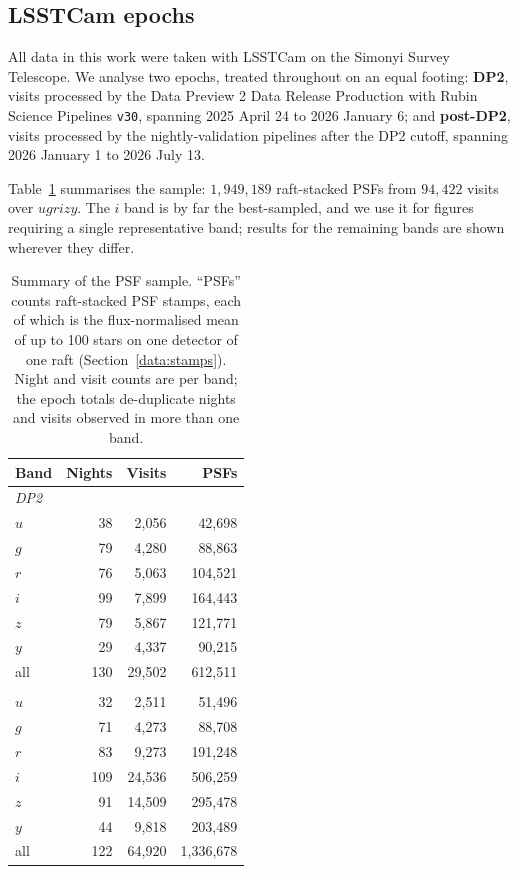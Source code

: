 \documentclass[]{spie}
\newcommand{\ugrizy}{\ensuremath{ugrizy}}
\begin{document}
\subsection{LSSTCam epochs}
\label{data:visits}

All data in this work were taken with LSSTCam on the Simonyi Survey Telescope. We analyse
two epochs, treated throughout on an equal footing: \textbf{DP2}, visits processed by the
Data Preview 2 Data Release Production \cite{DP2} with Rubin Science Pipelines
\texttt{v30}, spanning 2025 April 24 to 2026 January 6; and \textbf{post-DP2}, visits
processed by the nightly-validation pipelines after the DP2 cutoff, spanning 2026 January
1 to 2026 July 13.

Table~\ref{tab:sample} summarises the sample: $1{,}949{,}189$ raft-stacked PSFs from
$94{,}422$ visits over \ugrizy. The $i$ band is by far the best-sampled, and we use it for
figures requiring a single representative band; results for the remaining bands are shown
wherever they differ.

\begin{table}[htbp]
\caption{Summary of the PSF sample. ``PSFs'' counts raft-stacked PSF stamps, each of which
is the flux-normalised mean of up to 100 stars on one detector of one raft
(Section~\ref{data:stamps}). Night and visit counts are per band; the epoch totals
de-duplicate nights and visits observed in more than one band.}
\label{tab:sample}
\begin{center}
\begin{tabular}{lrrr}
\toprule
Band & Nights & Visits & PSFs \\
\midrule
\multicolumn{4}{l}{\textit{DP2}} \\
\quad $u$ & 38 & 2,056 & 42,698 \\
\quad $g$ & 79 & 4,280 & 88,863 \\
\quad $r$ & 76 & 5,063 & 104,521 \\
\quad $i$ & 99 & 7,899 & 164,443 \\
\quad $z$ & 79 & 5,867 & 121,771 \\
\quad $y$ & 29 & 4,337 & 90,215 \\
\quad all & 130 & 29,502 & 612,511 \\
\addlinespace
\multicolumn{4}{l}{\textit{Post-DP2}} \\
\quad $u$ & 32 & 2,511 & 51,496 \\
\quad $g$ & 71 & 4,273 & 88,708 \\
\quad $r$ & 83 & 9,273 & 191,248 \\
\quad $i$ & 109 & 24,536 & 506,259 \\
\quad $z$ & 91 & 14,509 & 295,478 \\
\quad $y$ & 44 & 9,818 & 203,489 \\
\quad all & 122 & 64,920 & 1,336,678 \\
\bottomrule
\end{tabular}
\end{center}
\end{table}
\end{document}
